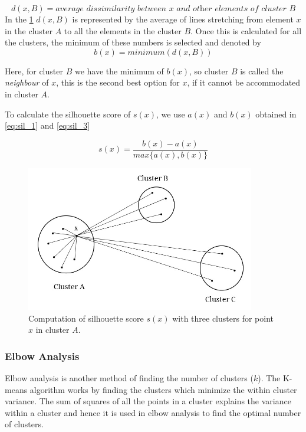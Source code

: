 \begin{equation}\label{eq:sil_2}
    d(x,B) = \textit{average dissimilarity between x and other elements of cluster B}  
\end{equation} %
In the \ref{fig:sil_score} $d(x,B)$ is represented by the average of lines stretching from element $x$ in the  cluster $A$ to all the elements in the cluster $B$. Once this is calculated for all the clusters, the minimum of these numbers is selected and denoted by 
\begin{equation}\label{eq:sil_3}
    b(x) = minimum(d(x, B))
\end{equation}

Here, for cluster $B$ we have the minimum of $b(x)$, so cluster $B$ is called the \textit{neighbour} of $x$, this is the second best option for $x$, if it cannot be accommodated in cluster $A$.

To calculate the silhouette score of $s(x)$, we use $a(x)$ and $b(x)$ obtained in \ref{eq:sil_1} and \ref{eq:sil_3}

\begin{equation}
    s(x) = \frac{b(x)-a(x)}{max\{a(x),b(x)\}}
\end{equation}


\begin{figure}[!ht]
    \centering
    \includegraphics[width= 10cm, keepaspectratio]{pics/sil_score.jpg}
    \captionsetup{justification=centering,margin=2cm}
    \caption{Computation of silhouette score $s(x)$ with three clusters for point $x$ in cluster $A$.}
    \label{fig:sil_score}
\end{figure}


\subsubsection{Elbow Analysis}
Elbow analysis \cite{thorndike1953belongs,ketchen1996application} is another method of finding the number of clusters ($k$). The K-means algorithm works by finding the clusters which minimize the within cluster variance. The sum of squares of all the points in a cluster explains the variance within a cluster and hence it is used in elbow analysis to find the optimal number of clusters. 


